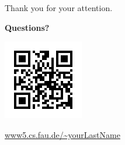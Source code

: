 \documentclass[aspectratio=43,t]{beamer}
\begin{document}
\begin{frame}{Thank you for your attention.}
	\centering
	\vspace{1cm}
		
	\textbf{\large Questions?}
	
	\vspace{0.5cm}

	\begin{center}
		\includegraphics[height=3.5cm]{./theme/art/tf/lme/qr-lme}
		
		\url{www5.cs.fau.de/~yourLastName}
	\end{center}
\end{frame}
\end{document}
